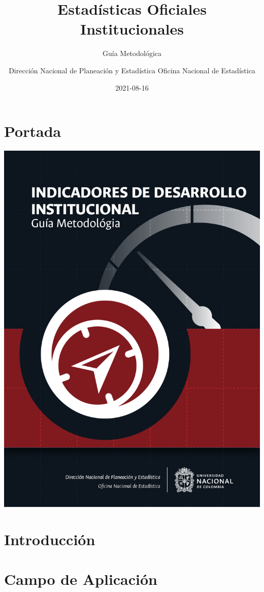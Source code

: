 \documentclass[
]{book}
\title{Estadísticas Oficiales Institucionales}
\subtitle{Guía Metodológica}
\author{Dirección Nacional de Planeación y Estadística Oficina Nacional de Estadística}
\date{2021-08-16}
\begin{document}
\maketitle

{
\setcounter{tocdepth}{1}
\tableofcontents
}
\hypertarget{portada}{%
\chapter*{Portada}\label{portada}}

\begin{center}\includegraphics[width=0.75\linewidth,]{imagenes/Portada} \end{center}

\hypertarget{intro}{%
\chapter{\texorpdfstring{\textbf{Introducción}}{Introducción}}\label{intro}}

\hypertarget{campo-de-aplicaciuxf3n}{%
\chapter{\texorpdfstring{\textbf{Campo de Aplicación}}{Campo de Aplicación}}\label{campo-de-aplicaciuxf3n}}
\end{document}
